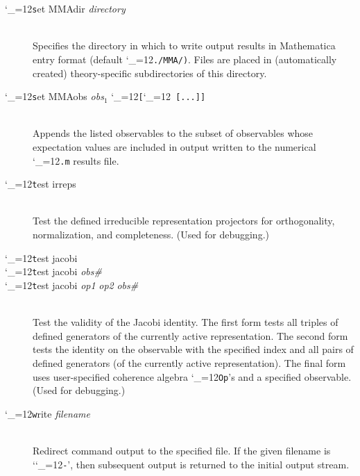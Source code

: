 \documentclass [12pt]{article}
\makeatletter
\renewcommand{\tt}{\begingroup\catcode`_=12\def\_{\string_}\tt@}
\newcommand{\tt@}[1]{\texttt{#1}\endgroup}
\makeatother
\begin{document}
\begin{description}
\item [\tt set MMAdir {\it directory}]~\\
    Specifies the directory in which to
    write output results in Mathematica entry format
    (default \tt{./MMA/)}.
    Files are placed in (automatically created)
    theory-specific subdirectories of this directory.

\item [\tt set MMAobs {\it obs$_1$} \tt{[}{\it obs$_2$}\tt{ [...]]}]~\\
    Appends the listed observables to the subset of observables whose
    expectation values are included in output written
    to the numerical \tt{.m} results file.

\item [\tt test irreps]~\\
    Test the defined irreducible representation projectors for
    orthogonality, normalization, and completeness.
    (Used for debugging.)

\item [\tt test jacobi] \bgroup \itemsep 0pt \parskip 0pt
\item [\tt test jacobi {\it obs\#}]
\item [\tt test jacobi {\it op1} {\it op2} {\it obs\#}]~\\
    Test the validity of the Jacobi identity.
    The first form tests all triples of defined generators
    of the currently active representation.
    The second form tests the identity on the 
    observable with the specified index and all pairs
    of defined generators (of the currently active
    representation).
    The final form uses user-specified
    coherence algebra \tt{Op}'s and a specified observable.
    (Used for debugging.)
\egroup

\item [\tt write {\it filename}]~\\
    Redirect command output to the specified file.
    If the given filename is `\tt{-}', then subsequent
    output is returned to the initial output stream.

\end{description}

\end{document}
